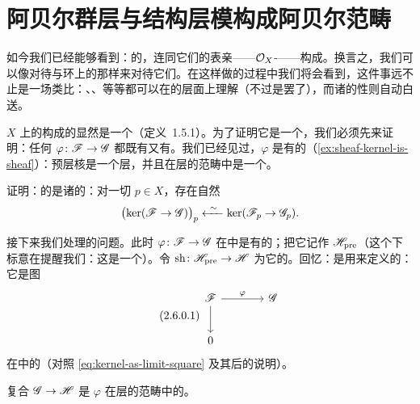 
\section{阿贝尔群层与结构层模构成阿贝尔范畴}

如今我们已经能够看到：\trAbelianGroups{}的\trSheaf，连同它们的表亲——$\mathcal{O}_X$-\trModule——构成\trAbelianCategory。换言之，我们可以像对待\trVectorSpace{}与环上的\trModule{}那样来对待它们。在这样做的过程中我们将会看到，这件事远不止是一场类比：\trKernel、\trCokernel、\trExactness{}等等都可以在\trStalk{}的层面上理解（\trStalk{}不过是\trAbelianGroups{}罢了），而诸\trGerm{}的\trCompatible{}性则自动白送。

\trTopologicalSpace{} $X$ 上\trAbelianGroups{}的\trSheaves{}构成的\trCategory{}显然是一个\trAdditiveCategory（\mbox{定义~1.5.1}）。为了证明它是一个\trAbelianCategory，我们必须先来证明：任何\trMorphism{} $\varphi\colon\mathscr{F}\to\mathscr{G}$ 都既有\trKernel{}又有\trCokernel。我们已经见过，$\varphi$ 是有\trKernel{}的（\cref{ex:sheaf-kernel-is-sheaf}）：预层核是一个层，并且在层的范畴中是一个\trKernel。

\begin{exercise}\label{ex:kernel-stalk-isomorphism}
证明：\trKernel{}的\trStalk{}是诸\trStalk{}的\trKernel：对一切 $p\in X$，存在自然\trIsomorphism
\[
\bigl(\ker(\scr{F}\to\scr{G})\bigr)_p\mathrel{\xleftarrow{\ \sim\ }}\ker(\scr{F}_p\to\scr{G}_p).
\]
\end{exercise}

接下来我们处理\trCokernel{}的问题。此时 $\varphi\colon\mathscr{F}\to\mathscr{G}$ 在\trPresheaf\trCategory{}中是有\trCokernel{}的；把它记作 $\mathscr{H}_{\mathrm{pre}}$（这个下标意在提醒我们：这是一个\trPresheaf）。令 $\mathrm{sh}\colon\mathscr{H}_{\mathrm{pre}}\to\mathscr{H}$ 为它的\trSheafification。回忆：\trCokernel{}是用\trUniversalProperty{}来定义的：它是图
\begin{equation*}\tag{2.6.0.1}\label{eq:cokernel-diagram-presheaves}
\begin{tikzcd}[row sep=2.4em, column sep=3.8em]
\scr{F} \ar[r, "\varphi"] \ar[d] & \scr{G} \\
0 &
\end{tikzcd}
\end{equation*}
在\trPresheaf\trCategory{}中的\trColimit（对照 \eqref{eq:kernel-as-limit-square} 及其后的说明）。

\begin{proposition}\label{thm:sheaf-cokernel-is-sheafification}
复合 $\mathscr{G}\to\mathscr{H}$ 是 $\varphi$ 在层的范畴中的\trCokernel。
\end{proposition}

